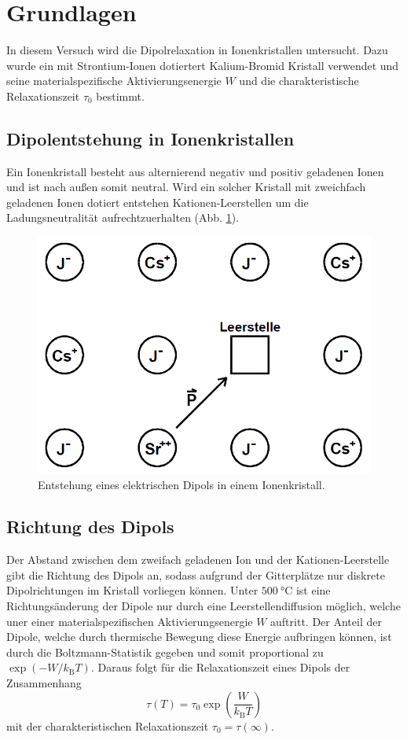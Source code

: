 \section{Grundlagen}
\label{sec:grundlagen}

In diesem Versuch wird die Dipolrelaxation in Ionenkristallen untersucht. 
Dazu wurde ein mit Strontium-Ionen dotiertert Kalium-Bromid Kristall verwendet und seine materialspezifische Aktivierungsenergie $W$ und die charakteristische Relaxationszeit $\tau_0$ bestimmt.
\FloatBarrier

\subsection{Dipolentstehung in Ionenkristallen} %
\label{sub:dipolentstehung_in_ionenkristallen}

Ein Ionenkristall besteht aus alternierend negativ und positiv geladenen Ionen und ist nach außen somit neutral.
Wird ein solcher Kristall mit zweichfach geladenen Ionen dotiert entstehen Kationen-Leerstellen um die Ladungsneutralität aufrechtzuerhalten (Abb. \ref{fig:dipol}). 
\begin{figure}
    \centering
    \includegraphics[width=0.5\linewidth]{data/Dipol.png}
    \caption{Entstehung eines elektrischen Dipols in einem Ionenkristall.}
    \label{fig:dipol}
\end{figure}

\subsection{Richtung des Dipols} %
\label{sub:richtung_des_dipols}

Der Abstand zwischen dem zweifach geladenen Ion und der Kationen-Leerstelle gibt die Richtung des Dipols an, sodass aufgrund der Gitterplätze nur diskrete Dipolrichtungen im Kristall vorliegen können.
Unter $\SI{500}{\celsius}$ ist eine Richtungsänderung der Dipole nur durch eine Leerstellendiffusion möglich, welche uner einer materialspezifischen Aktivierungsenergie $W$ auftritt.
Der Anteil der Dipole, welche durch thermische Bewegung diese Energie aufbringen können, ist durch die Boltzmann-Statistik gegeben und somit proportional zu $\exp{\left(-W/k_\text{B}T\right)}$.
Daraus folgt für die Relaxationszeit eines Dipols der Zusammenhang
\begin{equation}
    \tau(T) = \tau_0 \exp{\left(\frac{W}{k_\text{B}T}\right)}
\end{equation}
mit der charakteristischen Relaxationszeit $\tau_0 = \tau(\infty)$.


